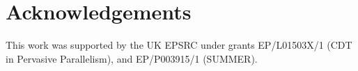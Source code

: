 \section*{Acknowledgements}

This work was supported by the UK EPSRC under grants EP/L01503X/1 (CDT in
Pervasive Parallelism), and EP/P003915/1 (SUMMER).
